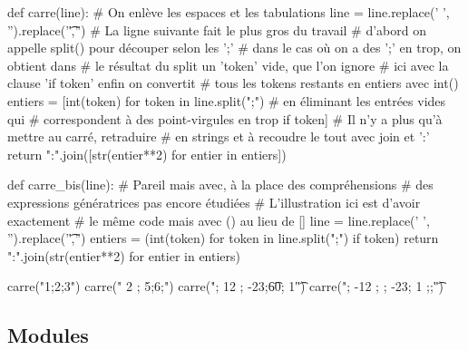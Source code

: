 \begin{solution}
\begin{idleconsole}
\begin{pyconsole}
def carre(line):
    # On enlève les espaces et les tabulations
    line = line.replace(' ', '').replace('\t','')
    # La ligne suivante fait le plus gros du travail
    # d'abord on appelle split() pour découper selon les ';'
    # dans le cas où on a des ';' en trop, on obtient dans 
    # le résultat du split un 'token' vide, que l'on ignore 
    # ici avec la clause 'if token' enfin on convertit
    # tous les tokens restants en entiers avec int()
    entiers = [int(token) for token in line.split(";")
               # en éliminant les entrées vides qui
               # correspondent à des point-virgules en trop
               if token]
    # Il n'y a plus qu'à mettre au carré, retraduire
    # en strings et à recoudre le tout avec join et ':'
    return ":".join([str(entier**2) for entier in entiers])

def carre_bis(line):
    # Pareil mais avec, à la place des compréhensions
    # des expressions génératrices pas encore étudiées
    # L'illustration ici est d'avoir exactement
    # le même code mais avec () au lieu de []
    line = line.replace(' ', '').replace('\t','')
    entiers = (int(token) for token in line.split(";")
               if token)
    return ":".join(str(entier**2) for entier in entiers)

carre("1;2;3")
carre(" 2 ;  5;6;")
carre("; 12 ;  -23;\t60; 1\t")
carre("; -12 ; ; -23; 1 ;;\t")
\end{pyconsole}
\end{idleconsole}
\end{solution}


\subsection[Modules]{Modules}
\label{sub:XI.4.2}

